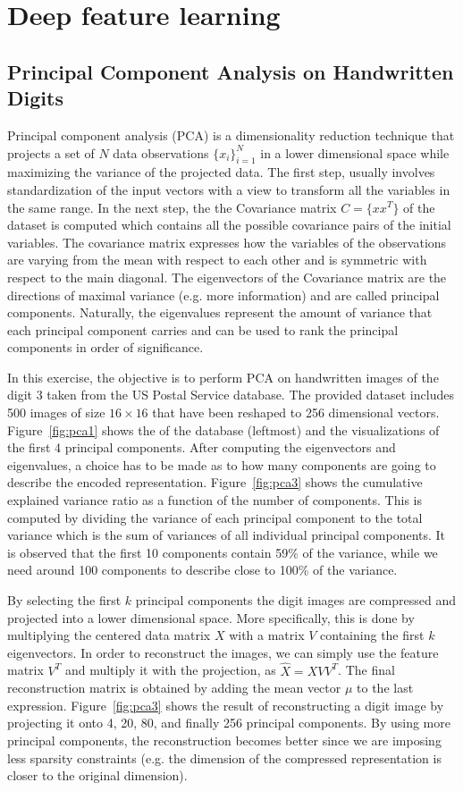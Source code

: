 \documentclass[conference,compsoc]{IEEEtran}
\begin{document}
  



\section{Deep feature learning}
\subsection{Principal Component Analysis on Handwritten Digits}
Principal component analysis (PCA) is a dimensionality reduction technique that projects a set of $N$ data observations $\{x_i\}_{i=1}^N$ in a lower dimensional space while maximizing the variance of the projected data. The first step, usually involves standardization of the input vectors with a view to transform all the variables in the same range. In the next step, the the Covariance matrix $C=\{xx^T\}$ of the dataset is computed which contains all the possible covariance pairs of the initial variables. The covariance matrix expresses how the variables of the observations are varying from the mean with respect to each other and is symmetric with respect to the main diagonal. The eigenvectors of the Covariance matrix are the directions of maximal variance (e.g. more information) and are called principal components. Naturally, the eigenvalues represent the amount of variance that each principal component carries and can be used to rank the principal components in order of significance.

In this exercise, the objective is to perform PCA on handwritten images of the digit 3 taken from the US Postal Service database. The provided dataset includes 500 images of size $16 \times 16$ that have been reshaped to 256 dimensional vectors. Figure~\ref{fig:pca1} shows the  of the database (leftmost) and the visualizations of the first 4 principal components. After computing the eigenvectors and eigenvalues, a choice has to be made as to how many components are going to describe the encoded representation. Figure~\ref{fig:pca3} shows the cumulative explained variance ratio as a function of the number of components. This is computed by dividing the variance of each principal component to the total variance which is the sum of variances of all individual principal components. It is observed that the first 10 components contain 59\% of the variance, while we need around 100 components to describe close to 100\% of the variance. 

By selecting the first $k$ principal components the digit images are compressed and projected into a lower dimensional space. More specifically, this is done by multiplying the centered data matrix $X$  with a matrix $V$ containing the first $k$ eigenvectors. In order to reconstruct the images, we can simply use the feature matrix $V^T$ and multiply it with the projection, as 
$\hat{X}=XVV^T$. The final reconstruction matrix is obtained by adding the mean vector $\mu$ to the last expression. Figure~\ref{fig:pca3} shows the result of reconstructing a digit image by projecting it onto 4, 20, 80, and finally 256 principal components. By using more principal components, the reconstruction becomes better since we are imposing less sparsity constraints (e.g. the dimension of the compressed representation is closer to the original dimension).
\end{document}
